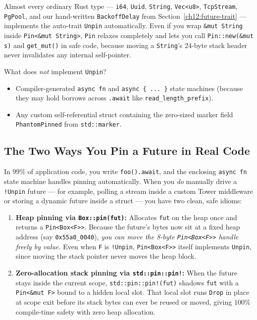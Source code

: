 Almost every ordinary Rust type --- \texttt{i64}, \texttt{Uuid}, \texttt{String}, \texttt{Vec<u8>}, \texttt{TcpStream}, \texttt{PgPool}, and our hand-written \texttt{BackoffDelay} from Section~\ref{ch12:future-trait} --- implements the auto-trait \texttt{Unpin} automatically. Even if you wrap \texttt{\&mut String} inside \texttt{Pin<\&mut String>}, \texttt{Pin} relaxes completely and lets you call \texttt{Pin::new(\&mut s)} and \texttt{get\_mut()} in safe code, because moving a \texttt{String}'s 24-byte stack header never invalidates any internal self-pointer.

What does \emph{not} implement \texttt{Unpin}?
\begin{itemize}
  \item Compiler-generated \texttt{async fn} and \texttt{async \{ ... \}} state machines (because they may hold borrows across \texttt{.await} like \texttt{read\_length\_prefix}).
  \item Any custom self-referential struct containing the zero-sized marker field \texttt{PhantomPinned} from \texttt{std::marker}.
\end{itemize}

\subsection{The Two Ways You Pin a Future in Real Code}

In $99\%$ of application code, you write \texttt{foo().await}, and the enclosing \texttt{async fn} state machine handles pinning automatically. When you \emph{do} manually drive a \texttt{!Unpin} future --- for example, polling a stream inside a custom Tower middleware or storing a dynamic future inside a struct --- you have two clean, safe idioms:

\begin{enumerate}
  \item \textbf{Heap pinning via \texttt{Box::pin(fut)}:} Allocates \texttt{fut} on the heap once and returns a \texttt{Pin<Box<F>>}. Because the future's bytes now sit at a fixed heap address (say \texttt{0x55a0\_0040}), \emph{you can move the 8-byte \texttt{Pin<Box<F>>} handle freely by value.} Even when \texttt{F} is \texttt{!Unpin}, \texttt{Pin<Box<F>>} itself implements \texttt{Unpin}, since moving the stack pointer never moves the heap block.
  \item \textbf{Zero-allocation stack pinning via \texttt{std::pin::pin!}:} When the future stays inside the current scope, \texttt{std::pin::pin!(fut)} shadows \texttt{fut} with a \texttt{Pin<\&mut F>} bound to a hidden local slot. That local slot runs \texttt{Drop} in place at scope exit before its stack bytes can ever be reused or moved, giving $100\%$ compile-time safety with zero heap allocation.
\end{enumerate}

